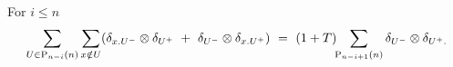 
\begin{lemma} \label{lemma: boundary gives the lower case}
	For $i \leq n$
	\begin{equation} \label{lemma4: existence: eq1}
	\sum_{U \in \mathrm{P}_{n-i}(n)} \sum_{x \notin U} (\delta_{x.U^-} \otimes \delta_{U^+}\ +\ \delta_{U^-} \otimes \delta_{x.U^+})\ = \
	(1+T) \!\! \sum_{\mathrm{P}_{n-i+1}(n)} \delta_{U^-} \otimes \delta_{U^+.}
	\end{equation}
\end{lemma}

